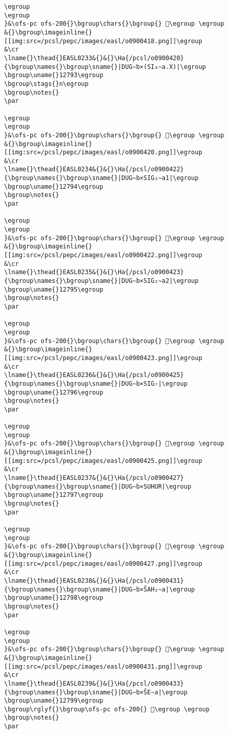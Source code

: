 \begin{verbatim}
\egroup
\egroup
}&\ofs-pc ofs-200{}\bgroup\chars{}\bgroup{} 𒞒\egroup \egroup
&{}\bgroup\imageinline{}[[img:src=/pcsl/pepc/images/easl/o0900418.png]]\egroup
&\cr
\lname{}\thead{}EASL0233&{}&{}\Ha{/pcsl/o0900420}{\bgroup\names{}\bgroup\sname{}|DUG∼b×(SI₄∼a.X)|\egroup
\bgroup\uname{}12793\egroup
\bgroup\stags{}n\egroup
\bgroup\notes{}
\par 

\egroup
\egroup
}&\ofs-pc ofs-200{}\bgroup\chars{}\bgroup{} 𒞓\egroup \egroup
&{}\bgroup\imageinline{}[[img:src=/pcsl/pepc/images/easl/o0900420.png]]\egroup
&\cr
\lname{}\thead{}EASL0234&{}&{}\Ha{/pcsl/o0900422}{\bgroup\names{}\bgroup\sname{}|DUG∼b×SIG₂∼a1|\egroup
\bgroup\uname{}12794\egroup
\bgroup\notes{}
\par 

\egroup
\egroup
}&\ofs-pc ofs-200{}\bgroup\chars{}\bgroup{} 𒞔\egroup \egroup
&{}\bgroup\imageinline{}[[img:src=/pcsl/pepc/images/easl/o0900422.png]]\egroup
&\cr
\lname{}\thead{}EASL0235&{}&{}\Ha{/pcsl/o0900423}{\bgroup\names{}\bgroup\sname{}|DUG∼b×SIG₂∼a2|\egroup
\bgroup\uname{}12795\egroup
\bgroup\notes{}
\par 

\egroup
\egroup
}&\ofs-pc ofs-200{}\bgroup\chars{}\bgroup{} 𒞕\egroup \egroup
&{}\bgroup\imageinline{}[[img:src=/pcsl/pepc/images/easl/o0900423.png]]\egroup
&\cr
\lname{}\thead{}EASL0236&{}&{}\Ha{/pcsl/o0900425}{\bgroup\names{}\bgroup\sname{}|DUG∼b×SIG₇|\egroup
\bgroup\uname{}12796\egroup
\bgroup\notes{}
\par 

\egroup
\egroup
}&\ofs-pc ofs-200{}\bgroup\chars{}\bgroup{} 𒞖\egroup \egroup
&{}\bgroup\imageinline{}[[img:src=/pcsl/pepc/images/easl/o0900425.png]]\egroup
&\cr
\lname{}\thead{}EASL0237&{}&{}\Ha{/pcsl/o0900427}{\bgroup\names{}\bgroup\sname{}|DUG∼b×SUHUR|\egroup
\bgroup\uname{}12797\egroup
\bgroup\notes{}
\par 

\egroup
\egroup
}&\ofs-pc ofs-200{}\bgroup\chars{}\bgroup{} 𒞗\egroup \egroup
&{}\bgroup\imageinline{}[[img:src=/pcsl/pepc/images/easl/o0900427.png]]\egroup
&\cr
\lname{}\thead{}EASL0238&{}&{}\Ha{/pcsl/o0900431}{\bgroup\names{}\bgroup\sname{}|DUG∼b×ŠAH₂∼a|\egroup
\bgroup\uname{}12798\egroup
\bgroup\notes{}
\par 

\egroup
\egroup
}&\ofs-pc ofs-200{}\bgroup\chars{}\bgroup{} 𒞘\egroup \egroup
&{}\bgroup\imageinline{}[[img:src=/pcsl/pepc/images/easl/o0900431.png]]\egroup
&\cr
\lname{}\thead{}EASL0239&{}&{}\Ha{/pcsl/o0900433}{\bgroup\names{}\bgroup\sname{}|DUG∼b×ŠE∼a|\egroup
\bgroup\uname{}12799\egroup
\bgroup\rglyf{}\bgroup\ofs-pc ofs-200{} 𒞙\egroup \egroup
\bgroup\notes{}
\par 


\end{verbatim}
